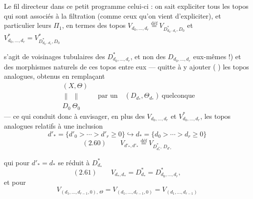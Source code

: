 \documentclass[11pt,a4paper]{article}
\begin{document}
Le fil directeur dans ce petit programme  celui-ci : on sait expliciter tous les topos qui sont associés à la filtration (comme ceux qu'on vient d'expliciter), et  particulier leurs $\Pi_1$, en termes \struck{\ill{}} des topos $V_{d_0,\dots,d_r}\overset{\text{déf}}{=}V_{D^*_{d_0\cdots d_r},D_0}$ et $V^*_{d_0,\dots,d_r}=V^*_{D^*_{d_0\cdots d_r},D_0}$

       s'agit de voisinages tubulaires des $D^*_{d_0,\dots,d_r}$, et non des $D_{d_0,\dots,d_r}$ eux-mêmes !) et des morphismes naturels de ces topos entre eux — quitte à y ajouter (  ) les topos analogues, obtenus en remplaçant
\[
\begin{array}{c}(X,\Theta)\\ \|\ \ \|\\ D_0\ \Theta_0\end{array}\quad\text{par un}\quad(D_{d_*},\Theta_{d_*})\ \text{quelconque}
\]
— ce qui conduit donc à envisager, en plus des $V_{d_0,\dots,d_r}$ et $V^*_{d_0,\dots,d_r}$, les topos analogues relatifs à une inclusion 
\[
d'_*=\{d'_0>\cdots>d'_r\geq0\}\hookrightarrow d_*=\{d_0>\cdots>d_r\geq0\}
\]
\[
(2.60)\qquad V_{d'_*,d'_*}\overset{\text{déf}}{=}V_{D^*_{d^*_*},\,D_{d'_*}}
\]

qui pour $d'_*=d_*$ se réduit à $D^*_{d_*}$
\[
(2.61)\qquad V_{d_*,d_*}=D^*_{d_*}=D^*_{d_0,\dots,d_r},
\]
 \ill{} et pour  
\[
V_{(d_1,\dots,d_{r-1},0),\,\Theta}=V_{(d_1,\dots,d_{r-1},0)}=V_{(d_1,\dots,d_{r-1})}
\]
\end{document}
